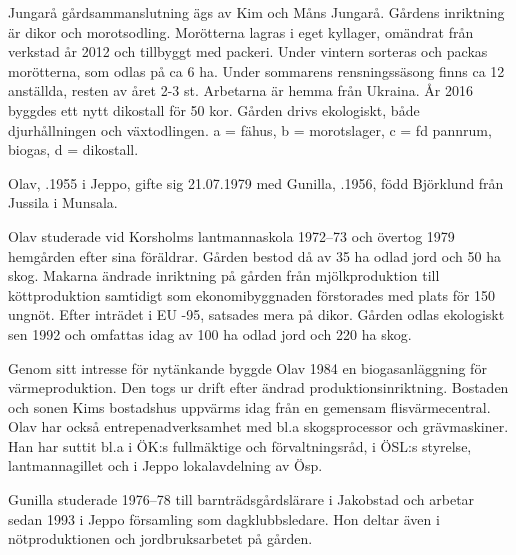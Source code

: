 

Jungarå gårdsammanslutning ägs av Kim och Måns Jungarå. Gårdens inriktning är dikor och morotsodling. Morötterna lagras i eget kyllager, omändrat från verkstad år 2012 och tillbyggt med packeri. Under vintern sorteras och packas morötterna, som odlas på ca 6 ha. Under sommarens rensningssäsong finns ca 12 anställda, resten av året 2-3 st. Arbetarna är hemma från Ukraina. År 2016 byggdes ett nytt dikostall för 50 kor. Gården drivs ekologiskt, både djurhållningen och växtodlingen. a = fähus, b = morotslager, c = fd pannrum, biogas,  d = dikostall.



Olav, .1955 i Jeppo, gifte sig 21.07.1979 med Gunilla, .1956, född Björklund från Jussila i Munsala.
\begin{jhchildren}
  \item {}
  \item {}
  \item {}
\end{jhchildren}
Olav studerade vid Korsholms lantmannaskola 1972--73 och övertog 1979 hemgården efter sina föräldrar. Gården bestod då av 35 ha odlad jord och 50 ha skog. Makarna ändrade inriktning på gården från mjölkproduktion till köttproduktion samtidigt som ekonomibyggnaden förstorades med plats för 150 ungnöt. Efter inträdet i EU -95, satsades mera på dikor. Gården odlas ekologiskt sen 1992 och omfattas idag av 100 ha odlad jord och 220 ha skog.

Genom sitt intresse för nytänkande byggde Olav 1984 en biogasanläggning för värmeproduktion. Den togs ur drift efter ändrad produktionsinriktning. Bostaden och sonen Kims bostadshus uppvärms idag från en gemensam flisvärmecentral. Olav har också entrepenadverksamhet med bl.a skogsprocessor och grävmaskiner. Han har suttit bl.a i ÖK:s fullmäktige och förvaltningsråd, i ÖSL:s styrelse, lantmannagillet och i Jeppo lokalavdelning av Ösp.

Gunilla studerade 1976--78 till barnträdsgårdslärare i Jakobstad och arbetar sedan 1993 i Jeppo församling som dagklubbsledare. Hon deltar även i nötproduktionen och jordbruksarbetet på gården.


